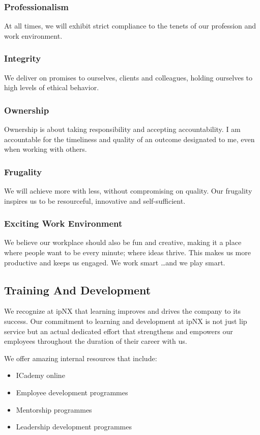 \subsubsection{Professionalism} At all times, we will exhibit strict compliance to the tenets of our profession and work environment.
\subsubsection{Integrity} We deliver on promises to ourselves, clients and colleagues, holding ourselves to high levels of ethical behavior.
\subsubsection{Ownership} Ownership is about taking responsibility and accepting accountability. I am accountable for the timeliness and quality of an outcome designated to me, even when working with others.
\subsubsection{Frugality} We will achieve more with less, without compromising on quality. Our frugality inspires us to be     resourceful, innovative    and self-sufficient.
\subsubsection{Exciting Work Environment} We believe our workplace should also be fun and creative, making it a place where people want to be every minute; where ideas thrive. This makes us more productive and keeps us engaged. We work smart …and we play smart.
\subsection{Training And Development}
We recognize at ipNX that learning improves and drives the company to its success. Our commitment to learning and development at ipNX is not just lip service but an actual dedicated effort that strengthens and empowers our employees throughout the duration of their career with us.

We offer amazing internal resources that include:
\begin{itemize}
	\item ICademy online
	\item Employee development programmes
	\item Mentorship programmes
	\item Leadership development programmes
\end{itemize}
